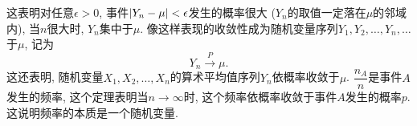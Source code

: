 这表明对任意$\epsilon > 0$, 事件$\abs{Y_n - \mu} < \epsilon$发生的概率很大 ($Y_n$的取值一定落在$\mu$的邻域内),
当$n$很大时, $Y_n$集中于$\mu$.
像这样表现的收敛性成为随机变量序列$Y_1, Y_2, \ldots, Y_n, \ldots$于$\mu$, 记为
\begin{equation}
    Y_n\xrightarrow{P}\mu.
\end{equation}
这还表明, 随机变量$X_1, X_2, \ldots, X_n$的算术平均值序列${Y_n}$依概率收敛于$\mu$.
$\dfrac{n_A}{n}$是事件$A$发生的频率, 这个定理表明当$n\to\infty$时,
这个频率依概率收敛于事件$A$发生的概率$p$.
这说明频率的本质是一个随机变量.
